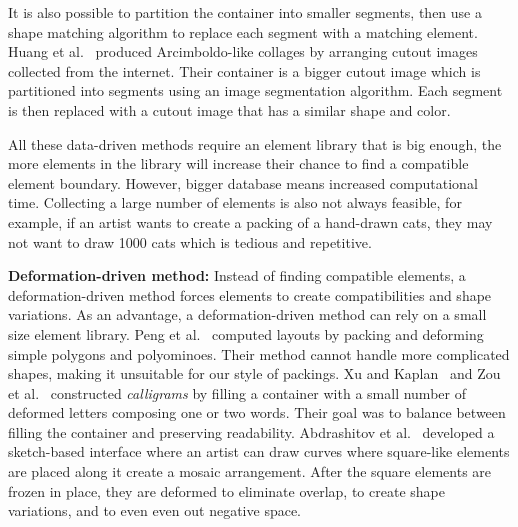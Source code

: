 It is also possible to partition the container into smaller segments,
then use a shape matching algorithm to replace each segment with
a matching element.
Huang et al.~\cite{Huang2011} produced Arcimboldo-like collages
by arranging cutout images collected from the internet.
Their container is a bigger cutout image which is partitioned into segments
using an image segmentation algorithm.
Each segment is then replaced with a cutout image that has a similar shape and color.

All these data-driven methods require an element library that is big enough,
the more elements in the library will increase their chance to find a compatible element boundary.
However, bigger database means increased computational time.
Collecting a large number of elements is also not always feasible,
for example, if an artist wants to create a packing of a hand-drawn cats,
they may not want to draw 1000 cats which is tedious and repetitive.


\textbf{Deformation-driven method:}
Instead of finding compatible elements,
a deformation-driven method forces elements to create compatibilities
and shape variations.
As an advantage, a deformation-driven method can rely on a small size element library.
Peng et al.~\cite{Peng2014} computed layouts by packing and deforming
simple polygons and polyominoes. Their method cannot handle more
complicated shapes, making it unsuitable for our style of packings.
Xu and Kaplan~\cite{Xu2007} and Zou et al.~\cite{Zou2016}
constructed \textit{calligrams} by filling a container with a small
number of deformed letters composing one or two words.  
Their goal was to balance between filling the container and preserving
readability.
Abdrashitov et al.~\cite{Abdrashitov2014} developed
a sketch-based interface where an artist can draw curves where square-like elements are placed along it
create a mosaic arrangement.
After the square elements are frozen in place, 
they are deformed to eliminate overlap, to create shape variations, 
and to even even out negative space.  

